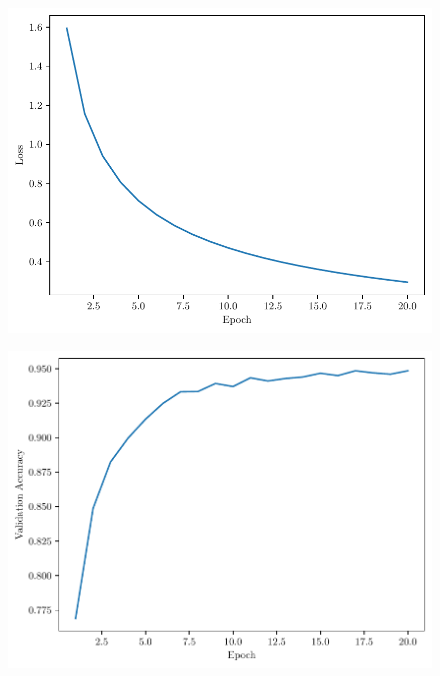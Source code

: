 \begin{questions}
        \begin{figure}[H]
            \centering
            \includegraphics[scale = 0.75]{feedforward-training-loss-0.01-100-3-0.3-relu-sgd-16.pdf}
        \end{figure}
    
        \begin{figure}[H]
            \centering
            \includegraphics[scale = 0.75]{feedforward-validation-accuracy-0.01-100-3-0.3-relu-sgd-16.pdf}
        \end{figure}

    \end{questions}

    \newpage

